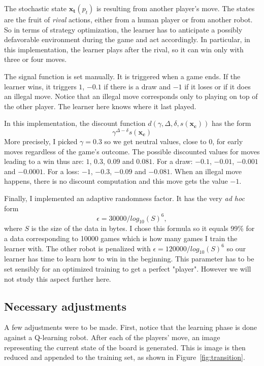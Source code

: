 \documentclass[letterpaper, 10.5 pt, conference]{ieeeconf}
\newcommand{\B}[1]{\mathbf{#1}}
\begin{document}
The stochastic state $\B{x_t}(p_t)$ is resulting from another player's move. The states are the fruit of \textit{rival} actions, either from a human player or from another robot. So in terms of strategy optimization, the learner has to anticipate a possibly defavorable environment during the game and act accordingly. In particular, in this implementation, the learner plays after the rival, so it can win only with three or four moves.

The signal function is set manually. It is triggered when a game ends. If the learner wins, it triggers $1$, $-0.1$ if there is a draw and $-1$ if it loses or if it does an illegal move. Notice that an illegal move corresponds only to playing on top of the other player. The learner here knows where it last played.

In this implementation, the discount function $d(\gamma, \Delta, \delta, s(\B{x_c}))$ has the form
$$\gamma^{\Delta-\delta}s(\B{x_c})$$
More precisely, I picked $\gamma=0.3$ so we get neutral values, close to $0$, for early moves regardless of the game's outcome. The possible discounted values for moves leading to a win thus are: $1$, $0.3$, $0.09$ and $0.081$. For a draw: $-0.1$, $-0.01$, $-0.001$ and $-0.0001$. For a loss: $-1$, $-0.3$, $-0.09$ and $-0.081$. When an illegal move happens, there is no discount computation and this move gets the value $-1$.

Finally, I implemented an adaptive randomness factor. It has the very \textit{ad hoc} form 
$$\epsilon = 30000/log_{10}(S)^6,$$
where $S$ is the size of the data in bytes. I chose this formula so it equals 99\% for a data corresponding to 10000 games which is how many games I train the learner with. The other robot is penalized with $\epsilon = 120000/log_{10}(S)^6$ so our learner has time to learn how to win in the beginning. This parameter has to be set sensibly for an optimized training to get a perfect "player". However we will not study this aspect further here.

\subsection{Necessary adjustments}

A few adjustments were to be made. First, notice that the learning phase is done against a Q-learning robot. After each of the players' move, an image representing the current state of the board is generated. This is image is then reduced and appended to the training set, as shown in Figure~\ref{fig:transition}.
\end{document}

